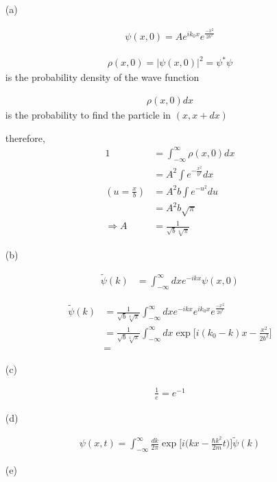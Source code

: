 \documentclass[11pt,a4paper]{article}
\begin{document}
\begin{enumerate}
\item[(a)]

\begin{align}
    \psi(x,0)=Ae^{ik_0x}e^{\frac{-x^2}{2b^2}}
\end{align}

\begin{align}
    \rho(x,0)=|\psi(x,0)|^2=\psi^*\psi
\end{align}
is the probability density of the wave function

\begin{align}
    \rho(x,0)dx
\end{align}
is the probability to find the particle in $(x,x+dx)$

therefore,
    \begin{align}
    1&=\int_{-\infty}^\infty\rho(x,0)dx\\
    &=A^2\int e^{-\frac{x^2}{b^2}}dx\\
    (u=\frac{x}{b})&=A^2b\int e^{-u^2}du\\
    &=A^2b\sqrt{\pi}\\
    \Rightarrow A&=\frac{1}{\sqrt{b}\sqrt[4]{\pi}}
\end{align}

\item[(b)]

\begin{align}
    \tilde{\psi}(k)&=\int^\infty_{-\infty} dx e^{-ikx}\psi(x,0)
\end{align}

\begin{align}
    \tilde{\psi}(k)
    &=\frac{1}{\sqrt{b}\sqrt[4]{\pi}}\int^\infty_{-\infty} dx e^{-ikx}e^{ik_0x}e^{\frac{-x^2}{2b^2}}\\
    &=\frac{1}{\sqrt{b}\sqrt[4]{\pi}}\int^\infty_{-\infty} dx \exp{\bigg[i(k_0-k)x-\frac{x^2}{2b^2}\bigg]}\\
    &=
\end{align}

\item[(c)]

\begin{align}
    \frac{1}{e}=e^{-1}
\end{align}

\item[(d)]

\begin{align}
    \psi(x,t)=\int^\infty_{-\infty} \frac{dk}{2\pi}\exp{\bigg[i\bigg(kx-\frac{\hbar k^2}{2m}t\bigg)\bigg]}\tilde{\psi}(k)
\end{align}

\item[(e)]

\end{enumerate}
\end{document}

